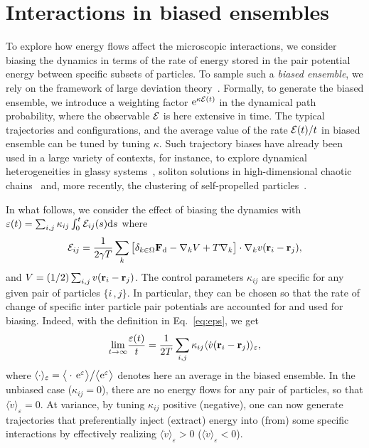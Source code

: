 \documentclass[pre, superscriptaddress, twocolumn,pre]{revtex4-1}
\newcommand{\ee}{\text{e}}
\begin{document}


\section{Interactions in biased ensembles}\label{sec:bias}

To explore how energy flows affect the microscopic interactions, we consider biasing the dynamics in terms of the rate of energy stored in the pair potential energy between specific subsets of particles. To sample such a {\it biased ensemble}, we rely on the framework of large deviation theory~\cite{Chetrite2013, Jack2010}. Formally, to generate the biased ensemble, we introduce a weighting factor $\ee^{\kappa{\cal{E}}(t)}$ in the dynamical path probability, where the observable $\cal{E}$ is here extensive in time. The typical trajectories and configurations, and the average value of the rate $
{\cal{E}}(t)/t$ in biased ensemble can be tuned by tuning $\kappa$. Such trajectory biases have already been used in a large variety of contexts, for instance, to explore dynamical heterogeneities in glassy systems~\cite{garrahan2007, Hedges2009, Pitard2011, Speck2012, Bodineau2012a, Limmer2014, Nemoto2017}, soliton solutions in high-dimensional chaotic chains~\cite{tailleur2007probing, laffargue2013} and, more recently, the clustering of self-propelled particles~\cite{Cagnetta2017, Whitelam2018, nemoto2018optimizing}.


In what follows, we consider the effect of biasing the dynamics with $\varepsilon(t)=\sum_{i,j} \kappa_{ij}\int_0^t{\cal E}_{ij}(s){\rm d}s$ where 
\begin{equation}\label{eq:eps}
	{\cal E}_{ij} = \frac{1}{2\gamma T}\sum_k\big[ \delta_{k\in\Omega}{\bf F}_{\rm d} - \nabla_k V + T \nabla_k\big] \cdot\nabla_k v({\bf r}_i-{\bf r}_j) ,
\end{equation}
and $V=(1/2)\sum_{i,j}v({\bf r}_i-{\bf r}_j)$. The control parameters $\kappa_{ij}$ are specific for any given pair of particles $\{i\,,j\}$. In particular, they can be chosen so that the rate of change of specific inter particle pair potentials are accounted for and used for biasing. Indeed, with the definition in Eq.~\ref{eq:eps}, we get
\begin{equation}
	\underset{t\to\infty}{\lim}\frac{\varepsilon(t)}{t} = \frac{1}{2T}\sum_{i,j}\kappa_{ij} \langle\dot v({\bf r}_i-{\bf r}_j)\rangle_\varepsilon ,
\end{equation}
where $\langle\cdot\rangle_\varepsilon=\big\langle\cdot\,{\rm e}^\varepsilon\big\rangle\big/\big\langle{\rm e}^\varepsilon\big\rangle$ denotes here an average in the biased ensemble.
In the unbiased case ($\kappa_{ij}=0$), there are no energy flows for any pair of particles, so that $\langle\dot v\rangle_\varepsilon = 0$. At variance, by tuning $\kappa_{ij}$ positive (negative), one can now generate trajectories that preferentially inject (extract) energy into (from) some specific interactions by effectively realizing $\langle\dot v\rangle_\varepsilon>0$ ($\langle\dot v\rangle_\varepsilon<0$).
\end{document}
